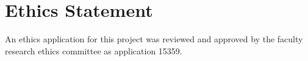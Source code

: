 \documentclass[ %
                    author={Bocheng Wang},
                supervisor={Dr. Qiang Liu},
                    degree={MSc},
                     title={A Research on Identification of Suicide Ideation in Texts with Multiple Models},
                      type={},
                      year={2024}]{dissertation}
\begin{document}



\maketitle


\frontmatter


\makedecl


\tableofcontents
\listoffigures
\listoftables



\chapter*{Ethics Statement}
\noindent
An ethics application for this project was reviewed and approved by the faculty research ethics committee as application 15359.

\end{document}
